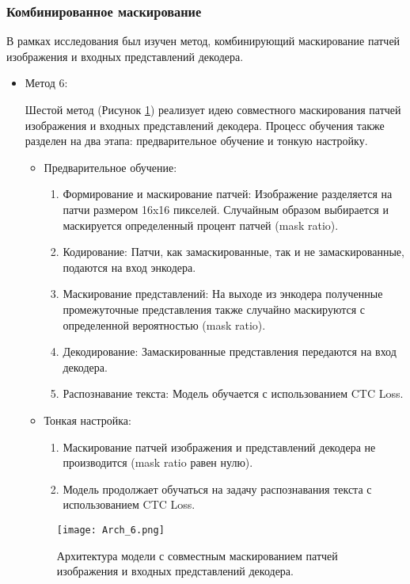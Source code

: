 \subsubsection{Комбинированное маскирование}
В рамках исследования был изучен метод, комбинирующий маскирование патчей изображения и входных представлений декодера.
\begin{itemize}
   \item Метод 6:
   
   Шестой метод (Рисунок \ref{8}) реализует идею совместного маскирования патчей изображения и входных представлений декодера. Процесс обучения также разделен на два этапа: предварительное обучение и тонкую настройку.

   \begin{itemize}
     \item Предварительное обучение:
     \begin{enumerate}
        \item Формирование и маскирование патчей: Изображение разделяется на патчи размером 16x16 пикселей. Случайным образом выбирается и маскируется определенный процент патчей (mask ratio).
        \item Кодирование: Патчи, как замаскированные, так и не замаскированные, подаются на вход энкодера.
        \item Маскирование представлений: На выходе из энкодера полученные промежуточные представления также случайно маскируются с определенной вероятностью (mask ratio). 
        \item Декодирование: Замаскированные представления передаются на вход декодера.
        \item Распознавание текста: Модель обучается с использованием CTC Loss.
     \end{enumerate}
     \item Тонкая настройка:
     \begin{enumerate}
        \item Маскирование патчей изображения и представлений декодера не производится (mask ratio равен нулю).
        \item Модель продолжает обучаться на задачу распознавания текста с использованием CTC Loss.
     \end{enumerate}
   \end{itemize}

   \begin{figure}[H]
     \centering
     \texttt{[image: Arch\_6.png]}
     \caption{Архитектура модели с совместным маскированием патчей изображения и входных представлений декодера.}
     \label{8} 
   \end{figure}
\end{itemize}


